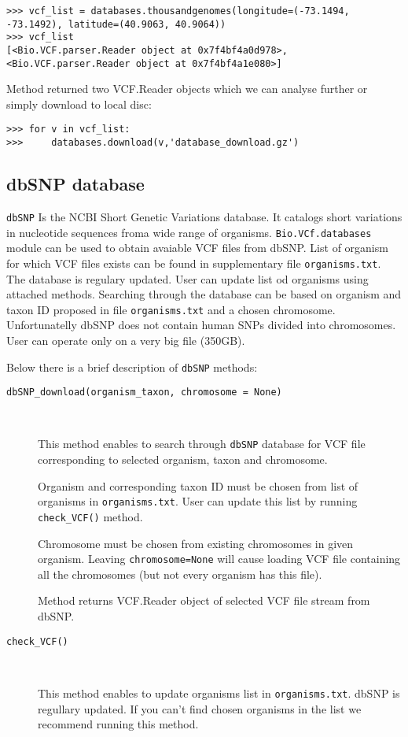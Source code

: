 \begin{verbatim}
>>> vcf_list = databases.thousandgenomes(longitude=(-73.1494, -73.1492), latitude=(40.9063, 40.9064))
>>> vcf_list
[<Bio.VCF.parser.Reader object at 0x7f4bf4a0d978>, <Bio.VCF.parser.Reader object at 0x7f4bf4a1e080>]

\end{verbatim}


\noindent Method returned two VCF.Reader objects which we can analyse further or simply download to local disc:


\begin{verbatim}
>>> for v in vcf_list:
>>>     databases.download(v,'database_download.gz')
\end{verbatim}

\subsection{dbSNP database}

\verb|dbSNP| Is the NCBI Short Genetic Variations database. It catalogs short variations in nucleotide sequences froma wide range of organisms. 
\verb|Bio.VCf.databases| module can be used to obtain avaiable VCF files from dbSNP. List of organism for which VCF files exists can be found in supplementary file \verb|organisms.txt|. The database is regulary updated. User can update list od organisms using attached methods. Searching through the database can be based on organism and taxon ID proposed in file \verb|organisms.txt| and a chosen chromosome. Unfortunatelly dbSNP does not contain human SNPs divided into chromosomes. User can operate only on a very big file (350GB).

\noindent Below there is a brief description of \verb|dbSNP| methods:

\begin{description}
  \item[\texttt{dbSNP\_download(organism\_taxon, chromosome = None)}] \

    This method enables to search through \verb|dbSNP| database for VCF file corresponding to selected
    organism, taxon and chromosome.
    
    Organism and corresponding taxon ID must be chosen from list of organisms in \verb|organisms.txt|. User can update this list by running
    \verb|check_VCF()| method.
    
    Chromosome must be chosen from existing chromosomes in given organism. Leaving \verb|chromosome=None| will cause loading VCF file
    containing all the chromosomes (but not every organism has this file).
    
    Method returns VCF.Reader object of selected VCF file stream from dbSNP.
    
    \item[\texttt{check\_VCF()}] \
    
    This method enables to update organisms list in \verb|organisms.txt|. dbSNP is regullary updated. If you can't find chosen organisms in 
    the list we recommend running this method. 

\end{description}

